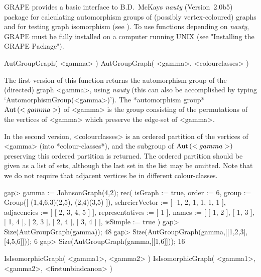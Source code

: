 %
%
%
%
\def\GRAPE{\sf GRAPE}
\def\nauty{\it nauty}
\def\G{\Gamma}
\def\Aut{{\rm Aut}\,}
\def\x{\times}

{\GRAPE} provides a basic interface to B.D.~McKay{\pif}s {\nauty}
(Version~2.0b5) package for calculating automorphism groups of
(possibly vertex-coloured) graphs and for testing graph isomorphism
(see \cite{Nau90}). To use functions depending on {\nauty}, {\GRAPE}
must be fully installed on a computer running UNIX (see "Installing the
GRAPE Package").


\>AutGroupGraph( <gamma> )
\>AutGroupGraph( <gamma>, <colourclasses> )

The first version of this function returns the automorphism group of the
(directed) graph <gamma>, using {\nauty} (this can also be accomplished
by typing `AutomorphismGroup(<gamma>)'). The *automorphism group*
$\Aut(<gamma>)$ of <gamma> is the group consisting of the permutations
of the vertices of <gamma> which preserve the edge-set of <gamma>.

In the second version, <colourclasses> is an ordered partition of
the vertices of <gamma> (into *colour-classes*), and the subgroup
of $\Aut(<gamma>)$ preserving this ordered partition is returned. The
ordered partition should be given as a list of sets, although the last
set in the list may be omitted.  Note that we do not require that adjacent
vertices be in different colour-classes.

\beginexample
gap> gamma := JohnsonGraph(4,2);                   
rec( isGraph := true, order := 6, 
  group := Group([ (1,4,6,3)(2,5), (2,4)(3,5) ]), 
  schreierVector := [ -1, 2, 1, 1, 1, 1 ], adjacencies := [ [ 2, 3, 4, 5 ] ], 
  representatives := [ 1 ], 
  names := [ [ 1, 2 ], [ 1, 3 ], [ 1, 4 ], [ 2, 3 ], [ 2, 4 ], [ 3, 4 ] ], 
  isSimple := true )
gap> Size(AutGroupGraph(gamma)); 
48
gap> Size(AutGroupGraph(gamma,[[1,2,3],[4,5,6]])); 
6
gap> Size(AutGroupGraph(gamma,[[1,6]]));          
16
\endexample


\>IsIsomorphicGraph( <gamma1>, <gamma2> )
\>IsIsomorphicGraph( <gamma1>, <gamma2>, <firstunbindcanon> )

